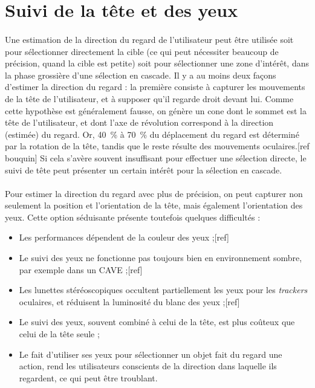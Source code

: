 \section{Suivi de la tête et des yeux}
	\paragraph{}
	Une estimation de la direction du regard de l'utilisateur peut être utilisée soit pour sélectionner directement la cible (ce qui peut nécessiter beaucoup de précision, quand la cible est petite) soit pour sélectionner une zone d'intérêt, dans la phase grossière d'une sélection en cascade. Il y a au moins deux façons d'estimer la direction du regard : la première consiste à capturer les mouvements de la tête de l'utilisateur, et à supposer qu'il regarde droit devant lui. Comme cette hypothèse est généralement fausse, on génère un cone dont le sommet est la tête de l'utilisateur, et dont l'axe de révolution correspond à la direction (estimée) du regard. Or, 40~\%{} à 70~\%{} du déplacement du regard est déterminé par la rotation de la tête, tandis que le reste résulte des mouvements oculaires.[ref bouquin] Si cela s'avère souvent insuffisant pour effectuer une sélection directe, le suivi de tête peut présenter un certain intérêt pour la sélection en cascade.
		
	\paragraph{}
	Pour estimer la direction du regard avec plus de précision, on peut capturer non seulement la position et l'orientation de la tête, mais également l'orientation des yeux. Cette option séduisante présente toutefois quelques difficultés :
	\begin{itemize}
		\item Les performances dépendent de la couleur des yeux ;[ref]
		\item Le suivi des yeux ne fonctionne pas toujours bien en environnement sombre, par exemple dans un CAVE ;[ref]
		\item Les lunettes stéréoscopiques occultent partiellement les yeux pour les \emph{trackers} oculaires, et réduisent la luminosité du blanc des yeux ;[ref]
		\item Le suivi des yeux, souvent combiné à celui de la tête, est plus coûteux que celui de la tête seule ;
		\item Le fait d'utiliser ses yeux pour sélectionner un objet fait du regard une action, rend les utilisateurs conscients de la direction dans laquelle ils regardent, ce qui peut être troublant.
	\end{itemize}


